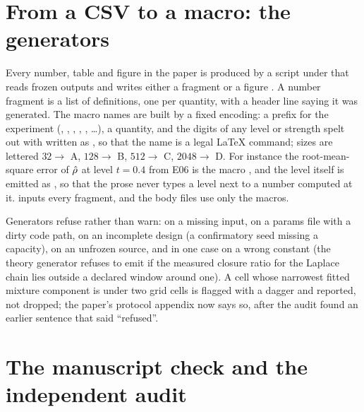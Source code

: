 \section{From a CSV to a macro: the generators}
\label{sec:generators}

\begingroup\sloppy
Every number, table and figure in the paper is produced by a script under
 that reads frozen outputs and writes either a fragment
 or a figure . A number
fragment is a list of  definitions, one per quantity,
with a header line saying it was generated. The macro names are built by a fixed
encoding: a prefix for the experiment (, , ,
, , \ldots), a quantity, and the digits of any level or strength
spelt out with  written as , so that the name is a legal LaTeX command;
sizes are lettered $32\to$ A, $128\to$ B, $512\to$ C, $2048\to$ D. For instance the
root-mean-square error of $\hat{\rho}$ at level $t=0.4$ from E06 is the macro
, and the level itself is emitted as
, so that the prose never types a level next to
a number computed at it.  inputs every fragment, and the body files
use only the macros.\par\endgroup

Generators refuse rather than warn: on a missing input, on a params file with a dirty
code path, on an incomplete design (a confirmatory seed missing a capacity), on an
unfrozen source, and in one case on a wrong constant (the theory generator refuses to
emit if the measured closure ratio for the Laplace chain lies outside a declared window
around one). A cell whose narrowest fitted mixture component is under two grid cells is
flagged with a dagger and reported, not dropped; the paper's protocol appendix now says
so, after the audit found an earlier sentence that said ``refused''.

\section{The manuscript check and the independent audit}
\label{sec:checks}

\subsection{}

